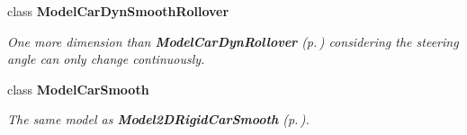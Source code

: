 \begin{CompactItemize}
class {\bf Model\-Car\-Dyn\-Smooth\-Rollover}
\begin{CompactList}\small\item\em One more dimension than {\bf Model\-Car\-Dyn\-Rollover} {\rm (p.\,\pageref{classModelCarDynRollover})} considering the steering angle can only change continuously.\item\end{CompactList}\item 
class {\bf Model\-Car\-Smooth}
\begin{CompactList}\small\item\em The same model as {\bf Model2DRigid\-Car\-Smooth} {\rm (p.\,\pageref{classModel2DRigidCarSmooth})}.\item\end{CompactList}\end{CompactItemize}
